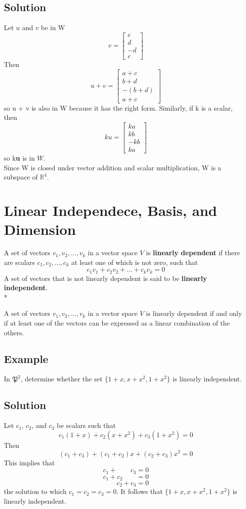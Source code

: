 \subsection*{Solution}
Let $u$ and $v$ be in W
$$v = \begin{bmatrix}
    c\\d\\-d\\c
\end{bmatrix}$$ Then
$$u + v = \begin{bmatrix}
    a+c\\b+d\\-(b+d)\\a+c
\end{bmatrix}$$
so u + v is also in W because it has the right form. Similarly, if k is a scalar, then $$ku = \begin{bmatrix}
    ka\\kb\\-kb\\ka
\end{bmatrix}$$ so k\textbf{u} is in $W$.\\
Since W is closed under vector addition and scalar multiplication, W is a subspace of $\mathbb{R}^4$.

\section{Linear Independece, Basis, and Dimension}
A set of vectors ${v_1, v_2, \dots, v_k}$ in a vector space $V$ is \textbf{linearly dependent} if there are scalars $c_1, c_2, \dots, c_k$ at least one of which is not zero, such that
$$c_1v_1 + c_2v_2 + \dots + c_kv_k = 0$$
A set of vectors that is not linearly dependent is said to be \textbf{linearly independent}.\\*

A set of vectors ${v_1, v_2, \dots, v_k}$ in a vector space $V$ is linearly dependent if and only if at least one of the vectors can be expressed as a linear combination of the others.

\subsection*{Example}
In $\mathfrak{P}^2$, determine whether the set $\{1+x, x+x^2, 1+x^2\}$ is linearly independent.

\subsection*{Solution}
Let $c_1$, $c_2$, and $c_3$ be scalars such that
$$c_1(1+x)+c_2(x+x^2)+c_3(1+x^2) = 0$$
Then $$(c_1 + c_3) + (c_1 + c_2)x + (c_2 + c_3)x^2 = 0$$
This implies that $$c_1 +\qquad c_3 = 0$$ $$c_1 + c_2\qquad = 0$$ $$\qquad c_2 + c_3 = 0$$
the solution to which $c_1 = c_2 = c_3 = 0$. It follows that $\{1+x, x+x^2, 1+x^2\}$ is linearly independent.

